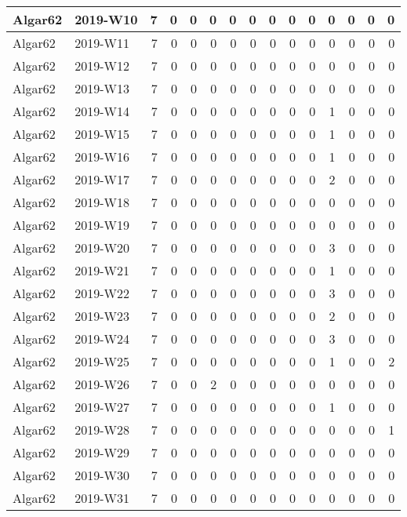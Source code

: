 \documentclass[]{book}
\begin{document}
\begin{table}
\begin{tabular}[t]{l|l|r|r|r|r|r|r|r|r|r|r|r|r|r}
\hline
Algar62 & 2019-W10 & 7 & 0 & 0 & 0 & 0 & 0 & 0 & 0 & 0 & 0 & 0 & 0 & 0\\
\hline
Algar62 & 2019-W11 & 7 & 0 & 0 & 0 & 0 & 0 & 0 & 0 & 0 & 0 & 0 & 0 & 0\\
\hline
Algar62 & 2019-W12 & 7 & 0 & 0 & 0 & 0 & 0 & 0 & 0 & 0 & 0 & 0 & 0 & 0\\
\hline
Algar62 & 2019-W13 & 7 & 0 & 0 & 0 & 0 & 0 & 0 & 0 & 0 & 0 & 0 & 0 & 0\\
\hline
Algar62 & 2019-W14 & 7 & 0 & 0 & 0 & 0 & 0 & 0 & 0 & 0 & 1 & 0 & 0 & 0\\
\hline
Algar62 & 2019-W15 & 7 & 0 & 0 & 0 & 0 & 0 & 0 & 0 & 0 & 1 & 0 & 0 & 0\\
\hline
Algar62 & 2019-W16 & 7 & 0 & 0 & 0 & 0 & 0 & 0 & 0 & 0 & 1 & 0 & 0 & 0\\
\hline
Algar62 & 2019-W17 & 7 & 0 & 0 & 0 & 0 & 0 & 0 & 0 & 0 & 2 & 0 & 0 & 0\\
\hline
Algar62 & 2019-W18 & 7 & 0 & 0 & 0 & 0 & 0 & 0 & 0 & 0 & 0 & 0 & 0 & 0\\
\hline
Algar62 & 2019-W19 & 7 & 0 & 0 & 0 & 0 & 0 & 0 & 0 & 0 & 0 & 0 & 0 & 0\\
\hline
Algar62 & 2019-W20 & 7 & 0 & 0 & 0 & 0 & 0 & 0 & 0 & 0 & 3 & 0 & 0 & 0\\
\hline
Algar62 & 2019-W21 & 7 & 0 & 0 & 0 & 0 & 0 & 0 & 0 & 0 & 1 & 0 & 0 & 0\\
\hline
Algar62 & 2019-W22 & 7 & 0 & 0 & 0 & 0 & 0 & 0 & 0 & 0 & 3 & 0 & 0 & 0\\
\hline
Algar62 & 2019-W23 & 7 & 0 & 0 & 0 & 0 & 0 & 0 & 0 & 0 & 2 & 0 & 0 & 0\\
\hline
Algar62 & 2019-W24 & 7 & 0 & 0 & 0 & 0 & 0 & 0 & 0 & 0 & 3 & 0 & 0 & 0\\
\hline
Algar62 & 2019-W25 & 7 & 0 & 0 & 0 & 0 & 0 & 0 & 0 & 0 & 1 & 0 & 0 & 2\\
\hline
Algar62 & 2019-W26 & 7 & 0 & 0 & 2 & 0 & 0 & 0 & 0 & 0 & 0 & 0 & 0 & 0\\
\hline
Algar62 & 2019-W27 & 7 & 0 & 0 & 0 & 0 & 0 & 0 & 0 & 0 & 1 & 0 & 0 & 0\\
\hline
Algar62 & 2019-W28 & 7 & 0 & 0 & 0 & 0 & 0 & 0 & 0 & 0 & 0 & 0 & 0 & 1\\
\hline
Algar62 & 2019-W29 & 7 & 0 & 0 & 0 & 0 & 0 & 0 & 0 & 0 & 0 & 0 & 0 & 0\\
\hline
Algar62 & 2019-W30 & 7 & 0 & 0 & 0 & 0 & 0 & 0 & 0 & 0 & 0 & 0 & 0 & 0\\
\hline
Algar62 & 2019-W31 & 7 & 0 & 0 & 0 & 0 & 0 & 0 & 0 & 0 & 0 & 0 & 0 & 0\\

\end{tabular}
\end{table}
\end{document}
